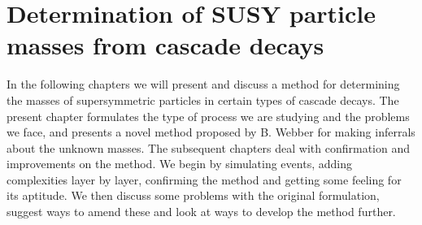 \documentclass[twoside,english]{uiofysmaster}
\begin{document}





\chapter{Determination of SUSY particle masses from cascade decays}
\label{chap:introducing_the_method}
In the following chapters we will present and discuss a method for determining the masses of supersymmetric particles in certain types of cascade decays. The present chapter formulates the type of process we are studying and the problems we face, and presents a novel method proposed by B. Webber \cite{Webber:2009vm} for making inferrals about the unknown masses. The subsequent chapters deal with confirmation and improvements on the method. We begin by simulating events, adding complexities layer by layer, confirming the method and getting some feeling for its aptitude. We then discuss some problems with the original formulation, suggest ways to amend these and look at ways to develop the method further.
\end{document}
